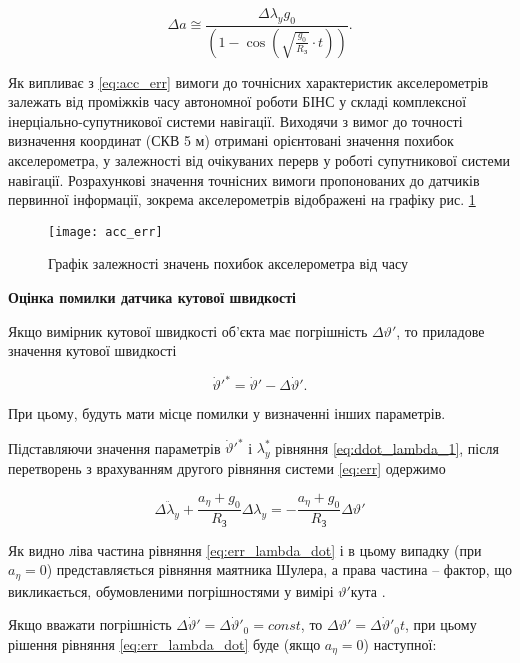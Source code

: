 \begin{equation} 
\label{eq:acc_err} 
\Delta a\cong \frac{\Delta \lambda _{y} g_{0} }{\left(1-\cos \left(\sqrt{\frac{g_{0} }{R_{{\text{З}}} } } \cdot t\right)\right)}.    
\end{equation} 

Як випливає з \eqref{eq:acc_err} вимоги до точнісних характеристик акселерометрів залежать від проміжків часу 
автономної роботи БІНС у складі комплексної інерціально-супутникової системи навігації. Виходячи з вимог до 
точності визначення координат (СКВ  5 м) отримані орієнтовані значення похибок акселерометра, у залежності 
від очікуваних перерв у роботі супутникової системи навігації. Розрахункові значення точнісних вимоги 
пропонованих до датчиків первинної інформації, зокрема акселерометрів відображені на графіку рис. \ref{fig:acc_err} 

\begin{figure}
\centering
\texttt{[image: acc\_err]}
\caption{Графік залежності значень похибок акселерометра від часу}
\label{fig:acc_err}
\end{figure} 
\vline 

\textbf{Оцінка помилки датчика кутової швидкості}

Якщо вимірник кутової швидкості об'єкта має погрішність $\Delta \vartheta '$, то приладове значення кутової швидкості

\[\dot{\vartheta }'^{*} =\dot{\vartheta }'-\Delta \dot{\vartheta }'.\] 

При цьому, будуть мати місце помилки у визначенні інших параметрів.

Підставляючи значення параметрів $\dot{\vartheta }'^{*} $ і  $\lambda _{y}^{*} $ рівняння \eqref{eq:ddot_lambda_1},  
після перетворень з врахуванням другого рівняння системи \eqref{eq:err} одержимо

\begin{equation} 
\label{eq:err_lambda_dot} 
\Delta \ddot{\lambda }_{y} +\frac{a_{\eta } +g_{0} }{R_{\text{З}} } \Delta \lambda _{y} =-\frac{a_{\eta } +g_{0} }{R_{\text{З}} } \Delta \vartheta ' 
\end{equation} 

Як видно ліва частина рівняння \eqref{eq:err_lambda_dot} і в цьому випадку (при $a_{\eta } =0$) представляється рівняння 
маятника Шулера, а права частина -- фактор, що викликається, обумовленими погрішностями у вимірі $\vartheta '$кута .

Якщо вважати погрішність $\Delta \dot{\vartheta }'=\Delta \dot{\vartheta }'_{0} =const$, то $\Delta \vartheta '=\Delta \dot{\vartheta }'_{0} t$, 
при цьому рішення рівняння 
\eqref{eq:err_lambda_dot} буде (якщо $a_{\eta } =0$) наступної:

